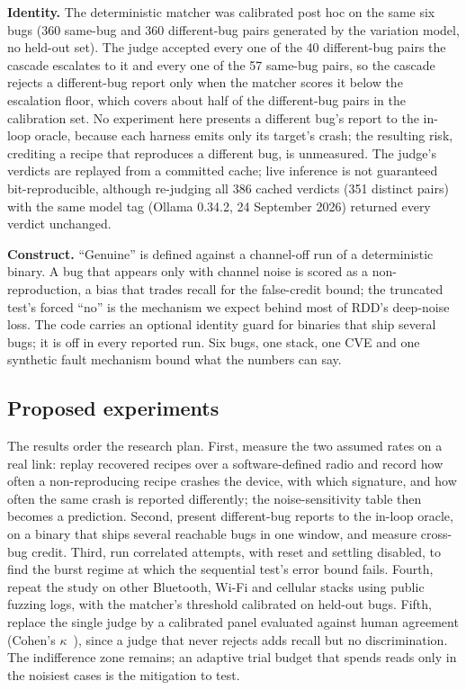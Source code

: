 \textbf{Identity.} The deterministic matcher was calibrated post hoc on the same
six bugs (360 same-bug and 360 different-bug pairs generated by the variation
model, no held-out set). The judge accepted every one of the 40 different-bug
pairs the cascade escalates to it and every one of the 57 same-bug pairs, so the
cascade rejects a different-bug report only when the matcher scores it below the
escalation floor, which covers about half of the different-bug pairs in the
calibration set. No experiment here presents a different bug's report to the
in-loop oracle, because each harness emits only its target's crash; the resulting
risk, crediting a recipe that reproduces a different bug, is unmeasured. The
judge's verdicts are replayed from a committed cache; live inference is not
guaranteed bit-reproducible, although re-judging all 386 cached verdicts (351 distinct pairs) with the
same model tag (Ollama 0.34.2, 24 September 2026) returned every verdict
unchanged.

\textbf{Construct.} ``Genuine'' is defined against a channel-off run of a
deterministic binary. A bug that appears only with channel noise is scored as a
non-reproduction, a bias that trades recall for the false-credit bound; the
truncated test's forced ``no'' is the mechanism we expect behind most of RDD's
deep-noise loss. The code carries an
optional identity guard for binaries that ship several bugs; it is off in every
reported run. Six bugs, one stack, one CVE and one synthetic fault mechanism bound
what the numbers can say.

\subsection{Proposed experiments}

The results order the research plan. First, measure the two assumed rates on a
real link: replay recovered recipes over a software-defined radio and record how
often a non-reproducing recipe crashes the device, with which signature, and how
often the same crash is reported differently; the noise-sensitivity table then
becomes a prediction. Second, present different-bug reports to the in-loop oracle,
on a binary that ships several reachable bugs in one window, and measure
cross-bug credit. Third, run correlated attempts, with reset and settling
disabled, to find the burst regime at which the sequential test's error bound
fails. Fourth, repeat the study on other Bluetooth, Wi-Fi and cellular stacks
using public fuzzing logs, with the matcher's threshold calibrated on held-out
bugs. Fifth, replace the single judge by a calibrated panel evaluated against
human agreement (Cohen's $\kappa$~\cite{cohenkappa1960}), since a judge that never
rejects adds recall but no discrimination. The indifference zone remains; an
adaptive trial budget that spends reads only in the noisiest cases is the
mitigation to test.
